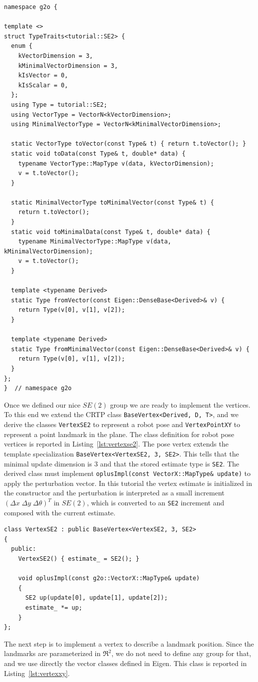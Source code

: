 \documentclass[a4paper]{article}
\begin{document}
\begin{lstlisting}[float,label=lst:se2typetraits,caption=TypeTraits for the
  tutorial SE2 estimate type]
namespace g2o {

template <>
struct TypeTraits<tutorial::SE2> {
  enum {
    kVectorDimension = 3,
    kMinimalVectorDimension = 3,
    kIsVector = 0,
    kIsScalar = 0,
  };
  using Type = tutorial::SE2;
  using VectorType = VectorN<kVectorDimension>;
  using MinimalVectorType = VectorN<kMinimalVectorDimension>;

  static VectorType toVector(const Type& t) { return t.toVector(); }
  static void toData(const Type& t, double* data) {
    typename VectorType::MapType v(data, kVectorDimension);
    v = t.toVector();
  }

  static MinimalVectorType toMinimalVector(const Type& t) {
    return t.toVector();
  }
  static void toMinimalData(const Type& t, double* data) {
    typename MinimalVectorType::MapType v(data, kMinimalVectorDimension);
    v = t.toVector();
  }

  template <typename Derived>
  static Type fromVector(const Eigen::DenseBase<Derived>& v) {
    return Type(v[0], v[1], v[2]);
  }

  template <typename Derived>
  static Type fromMinimalVector(const Eigen::DenseBase<Derived>& v) {
    return Type(v[0], v[1], v[2]);
  }
};
}  // namespace g2o
\end{lstlisting}

Once we defined our nice $SE(2)$ group we are ready to implement the
vertices. To this end we extend the CRTP class
\verb+BaseVertex<Derived, D, T>+, and we derive the classes
\verb+VertexSE2+ to represent a robot pose and \verb+VertexPointXY+
to represent a point landmark in the plane. The class definition for
robot pose vertices is reported in Listing~\ref{lst:vertexse2}.
The pose vertex extends the template specialization
\verb+BaseVertex<VertexSE2, 3, SE2>+. This tells \gopt{} that the
minimal update dimension is 3 and that the stored estimate type is
\verb+SE2+. The derived class must implement
\verb+oplusImpl(const VectorX::MapType& update)+ to apply the
perturbation vector. In this tutorial the vertex estimate is
initialized in the constructor and the perturbation is interpreted as
a small increment $(\Delta x \; \Delta y \; \Delta \theta)^T$ in
$SE(2)$, which is converted to an \verb+SE2+ increment and composed
with the current estimate.

\begin{lstlisting}[float,label=lst:vertexse2,caption=Vertex representing
  a 2D robot pose]
class VertexSE2 : public BaseVertex<VertexSE2, 3, SE2>
{
  public:
    VertexSE2() { estimate_ = SE2(); }

    void oplusImpl(const g2o::VectorX::MapType& update)
    {
      SE2 up(update[0], update[1], update[2]);
      estimate_ *= up;
    }
};
\end{lstlisting}
The next step is to implement a vertex to describe a landmark
position. Since the landmarks are parameterized in $\Re^2$, we do not
need to define any group for that, and we use directly the vector
classes defined in Eigen. This class is reported in Listing~\ref{lst:vertexxy}.
\end{document}

